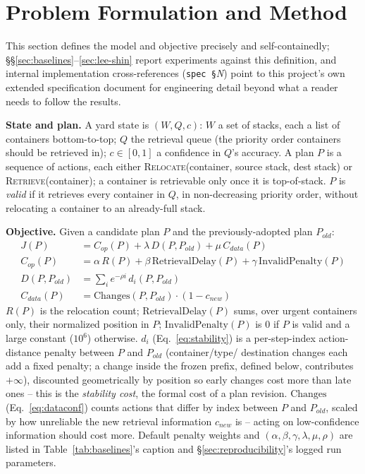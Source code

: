 \documentclass[11pt]{article}
\begin{document}
\section{Problem Formulation and Method}
\label{sec:formulation}

This section defines the model and objective precisely and
self-containedly; \S\S\ref{sec:baselines}--\ref{sec:lee-shin} report
experiments against this definition, and internal implementation
cross-references (\texttt{spec \S}\emph{N}) point to this project's own
extended specification document for engineering detail beyond what a
reader needs to follow the results.

\textbf{State and plan.} A yard state is $(W, Q, c)$: $W$ a set of
stacks, each a list of containers bottom-to-top; $Q$ the retrieval queue
(the priority order containers should be retrieved in); $c \in [0,1]$ a
confidence in $Q$'s accuracy. A plan $P$ is a sequence of actions, each
either \textsc{Relocate}(container, source stack, dest stack) or
\textsc{Retrieve}(container); a container is retrievable only once it is
top-of-stack. $P$ is \emph{valid} if it retrieves every container in $Q$,
in non-decreasing priority order, without relocating a container to an
already-full stack.

\textbf{Objective.} Given a candidate plan $P$ and the previously-adopted
plan $P_{old}$:
\begin{align}
J(P) &= C_{op}(P) + \lambda \, D(P, P_{old}) + \mu \, C_{data}(P) \label{eq:objective}\\
C_{op}(P) &= \alpha \, R(P) + \beta \, \mathrm{RetrievalDelay}(P) + \gamma \, \mathrm{InvalidPenalty}(P) \label{eq:opcost}\\
D(P, P_{old}) &= \sum_{i} e^{-\rho i} \, d_i(P, P_{old}) \label{eq:stability}\\
C_{data}(P) &= \mathrm{Changes}(P, P_{old}) \cdot (1 - c_{new}) \label{eq:dataconf}
\end{align}
$R(P)$ is the relocation count; $\mathrm{RetrievalDelay}(P)$ sums, over
urgent containers only, their normalized position in $P$;
$\mathrm{InvalidPenalty}(P)$ is $0$ if $P$ is valid and a large constant
($10^6$) otherwise. $d_i$ (Eq.~\ref{eq:stability}) is a per-step-index
action-distance penalty between $P$ and $P_{old}$ (container/type/
destination changes each add a fixed penalty; a change inside the frozen
prefix, defined below, contributes $+\infty$), discounted geometrically by
position so early changes cost more than late ones -- this is the
\emph{stability cost}, the formal cost of a plan revision. $\mathrm{Changes}$
(Eq.~\ref{eq:dataconf}) counts actions that differ by index between $P$
and $P_{old}$, scaled by how unreliable the new retrieval information
$c_{new}$ is -- acting on low-confidence information should cost more.
Default penalty weights and $(\alpha,\beta,\gamma,\lambda,\mu,\rho)$ are
listed in Table~\ref{tab:baselines}'s caption and \S\ref{sec:reproducibility}'s
logged run parameters.
\end{document}
